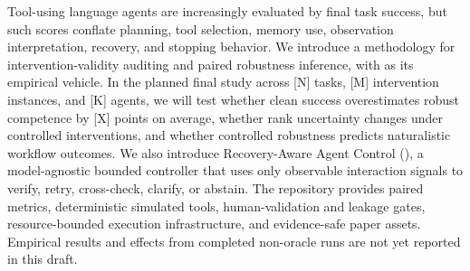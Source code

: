 Tool-using language agents are increasingly evaluated by final task success, but such scores conflate planning, tool selection, memory use, observation interpretation, recovery, and stopping behavior. We introduce a methodology for intervention-validity auditing and paired robustness inference, with \benchmark as its empirical vehicle. In the planned final study across [N] tasks, [M] intervention instances, and [K] agents, we will test whether clean success overestimates robust competence by [X] points on average, whether rank uncertainty changes under controlled interventions, and whether controlled robustness predicts naturalistic workflow outcomes. We also introduce Recovery-Aware Agent Control (\RAAC), a model-agnostic bounded controller that uses only observable interaction signals to verify, retry, cross-check, clarify, or abstain. The repository provides paired metrics, deterministic simulated tools, human-validation and leakage gates, resource-bounded execution infrastructure, and evidence-safe paper assets. Empirical results and \RAAC effects from completed non-oracle runs are not yet reported in this draft.
